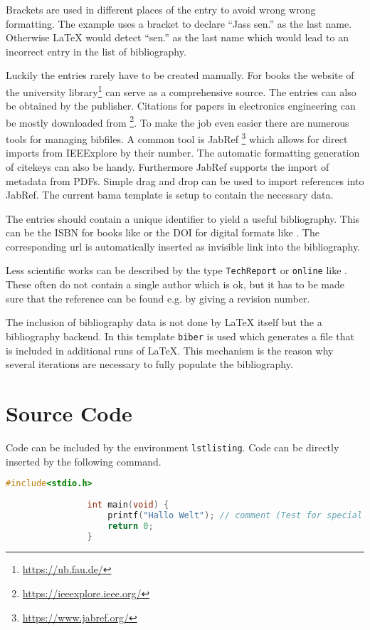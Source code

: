 		Brackets are used in different places of the entry to avoid wrong wrong formatting. The example uses a bracket to declare \enquote{Jass sen.} as the last name. Otherwise {\LaTeX} would detect \enquote{sen.} as the last name which would lead to an incorrect entry in the list of bibliography.
		
		Luckily the entries rarely have to be created manually. For books the website of the university library\footnote{\url{https://ub.fau.de/}} can serve as a comprehensive source. The entries can also be obtained by the publisher. Citations for papers in electronics engineering can be mostly downloaded from \footnote{\url{https://ieeexplore.ieee.org/}}. To make the job even easier there are numerous tools for managing bibfiles. A common tool is JabRef \footnote{\url{https://www.jabref.org/}} which allows for direct imports from IEEExplore by their number. The automatic formatting generation of citekeys can also be handy. Furthermore JabRef supports the import of metadata from PDFs. Simple drag and drop can be used to import references into JabRef. The current bama template is setup to contain the necessary data.
		
		The entries should contain a unique identifier to yield a useful bibliography. This can be the ISBN for books like \cite{tietze2019} or the DOI for digital formats like \cite{paskin1999}. The corresponding url is automatically inserted as invisible link into the bibliography.
		
		Less scientific works can be described by the type \texttt{TechReport} or \texttt{online} like \cite{stm32l476, lehman2020}. These often do not contain a single author which is ok, but it has to be made sure that the reference can be found e.g. by giving a revision number.
		
		The inclusion of bibliography data is not done by {\LaTeX} itself but the a bibliography backend. In this template \texttt{biber} is used which generates a file that is included in additional runs of {\LaTeX}. This mechanism is the reason why several iterations are necessary to fully populate the bibliography.

	\section{Source Code}

		Code can be included by the environment \texttt{lstlisting}. Code can be directly inserted by the following command.
		
		{\lstset{language=TeX}}
		{}
		\begin{lstlistingoflisting}[language=TeX]
			\begin{lstlisting}[language=C]
				#include<stdio.h>
				
				int main(void) {
					printf("Hallo Welt"); // comment (Test for special chars: äöüß)
					return 0;
				}
			\end{lstlisting}
		\end{lstlistingoflisting}
	
